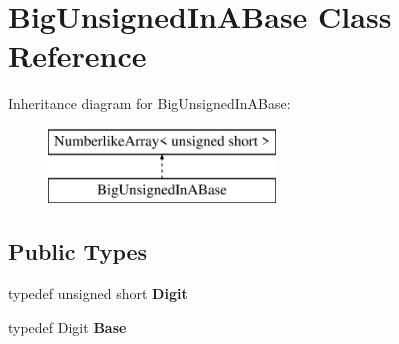 \hypertarget{class_big_unsigned_in_a_base}{}\section{Big\+Unsigned\+In\+A\+Base Class Reference}
\label{class_big_unsigned_in_a_base}
Inheritance diagram for Big\+Unsigned\+In\+A\+Base\+:\begin{figure}[H]
\begin{center}
\leavevmode
\includegraphics[height=2.000000cm]{class_big_unsigned_in_a_base}
\end{center}
\end{figure}
\subsection*{Public Types}
\begin{DoxyCompactItemize}
\item 
\mbox{\label{class_big_unsigned_in_a_base_a266740bde3dfd4bf858bcf0211a86209}} 
typedef unsigned short {\bfseries Digit}
\item 
\mbox{\label{class_big_unsigned_in_a_base_a357d3922227fcb502acd69b5b9288bd1}} 
typedef Digit {\bfseries Base}
\end{DoxyCompactItemize}
